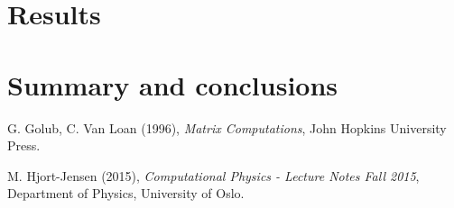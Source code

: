 \documentclass[12pt, a4paper]{article}
\begin{document}
\section{Results}

\section{Summary and conclusions}

\begin{thebibliography}{40}

 G. Golub, C. Van Loan (1996), \textit{Matrix Computations}, John Hopkins University 
Press. 

 M. Hjort-Jensen (2015), \textit{Computational Physics - Lecture Notes Fall 2015}, 
Department of Physics, University of Oslo. 



\end{thebibliography}
\end{document}
